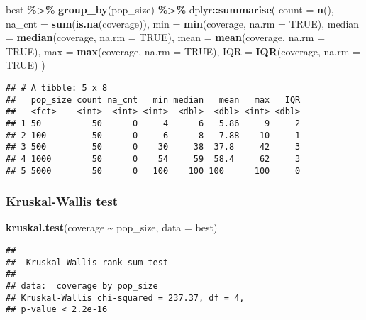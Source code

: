 \documentclass[
]{book}
\newenvironment{Shaded}{\begin{snugshade}}{\end{snugshade}}
\newcommand{\AttributeTok}[1]{\textcolor[rgb]{0.13,0.29,0.53}{#1}}
\newcommand{\ConstantTok}[1]{\textcolor[rgb]{0.56,0.35,0.01}{#1}}
\newcommand{\FunctionTok}[1]{\textcolor[rgb]{0.13,0.29,0.53}{\textbf{#1}}}
\newcommand{\NormalTok}[1]{#1}
\newcommand{\SpecialCharTok}[1]{\textcolor[rgb]{0.81,0.36,0.00}{\textbf{#1}}}
\begin{document}
\begin{Shaded}
\begin{Highlighting}[]
\NormalTok{best }\SpecialCharTok{\%\textgreater{}\%}
  \FunctionTok{group\_by}\NormalTok{(pop\_size) }\SpecialCharTok{\%\textgreater{}\%}
\NormalTok{  dplyr}\SpecialCharTok{::}\FunctionTok{summarise}\NormalTok{(}
    \AttributeTok{count =} \FunctionTok{n}\NormalTok{(),}
    \AttributeTok{na\_cnt =} \FunctionTok{sum}\NormalTok{(}\FunctionTok{is.na}\NormalTok{(coverage)),}
    \AttributeTok{min =} \FunctionTok{min}\NormalTok{(coverage, }\AttributeTok{na.rm =} \ConstantTok{TRUE}\NormalTok{),}
    \AttributeTok{median =} \FunctionTok{median}\NormalTok{(coverage, }\AttributeTok{na.rm =} \ConstantTok{TRUE}\NormalTok{),}
    \AttributeTok{mean =} \FunctionTok{mean}\NormalTok{(coverage, }\AttributeTok{na.rm =} \ConstantTok{TRUE}\NormalTok{),}
    \AttributeTok{max =} \FunctionTok{max}\NormalTok{(coverage, }\AttributeTok{na.rm =} \ConstantTok{TRUE}\NormalTok{),}
    \AttributeTok{IQR =} \FunctionTok{IQR}\NormalTok{(coverage, }\AttributeTok{na.rm =} \ConstantTok{TRUE}\NormalTok{)}
\NormalTok{  )}
\end{Highlighting}
\end{Shaded}

\begin{verbatim}
## # A tibble: 5 x 8
##   pop_size count na_cnt   min median   mean   max   IQR
##   <fct>    <int>  <int> <int>  <dbl>  <dbl> <int> <dbl>
## 1 50          50      0     4      6   5.86     9     2
## 2 100         50      0     6      8   7.88    10     1
## 3 500         50      0    30     38  37.8     42     3
## 4 1000        50      0    54     59  58.4     62     3
## 5 5000        50      0   100    100 100      100     0
\end{verbatim}

\hypertarget{kruskal-wallis-test-3}{%
\subsubsection{Kruskal-Wallis test}\label{kruskal-wallis-test-3}}

\begin{Shaded}
\begin{Highlighting}[]
\FunctionTok{kruskal.test}\NormalTok{(coverage }\SpecialCharTok{\textasciitilde{}}\NormalTok{ pop\_size, }\AttributeTok{data =}\NormalTok{ best)}
\end{Highlighting}
\end{Shaded}

\begin{verbatim}
## 
##  Kruskal-Wallis rank sum test
## 
## data:  coverage by pop_size
## Kruskal-Wallis chi-squared = 237.37, df = 4,
## p-value < 2.2e-16
\end{verbatim}
\end{document}
